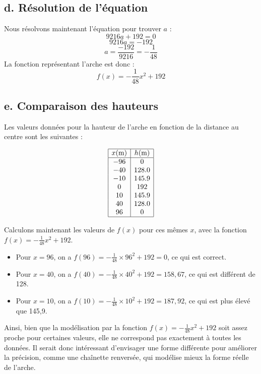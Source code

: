 \documentclass[a4paper, 12pt]{article}
\begin{document}
\subsection*{d. Résolution de l'équation}
Nous résolvons maintenant l’équation pour trouver \(a\) :
\[
9216a + 192 = 0
\]
\[
9216a = -192
\]
\[
a = \frac{-192}{9216} = -\frac{1}{48}
\]
La fonction représentant l’arche est donc :
\[
f(x) = -\frac{1}{48}x^2 + 192
\]

\subsection*{e. Comparaison des hauteurs}

Les valeurs données pour la hauteur de l’arche en fonction de la distance au centre sont les suivantes :

\[
\begin{array}{|c|c|}
\hline
x (\text{m}) & h (\text{m}) \\
\hline
-96 & 0 \\
-40 & 128.0 \\
-10 & 145.9 \\
0 & 192 \\
10 & 145.9 \\
40 & 128.0 \\
96 & 0 \\
\hline
\end{array}
\]

Calculons maintenant les valeurs de \( f(x) \) pour ces mêmes \( x \), avec la fonction \( f(x) = -\frac{1}{48}x^2 + 192 \).

\begin{itemize}[noitemsep]
    \item Pour \( x = 96 \), on a \( f(96) = -\frac{1}{48} \times 96^2 + 192 = 0 \), ce qui est correct.
    \item Pour \( x = 40 \), on a \( f(40) = -\frac{1}{48} \times 40^2 + 192 = 158{,}67 \), ce qui est différent de 128.
    \item Pour \( x = 10 \), on a \( f(10) = -\frac{1}{48} \times 10^2 + 192 = 187{,}92 \), ce qui est plus élevé que 145{,}9.
\end{itemize}

Ainsi, bien que la modélisation par la fonction \( f(x) = -\frac{1}{48}x^2 + 192 \) soit assez proche pour certaines valeurs, elle ne correspond pas exactement à toutes les données. Il serait donc intéressant d’envisager une forme différente pour améliorer la précision, comme une chaînette renversée, qui modélise mieux la forme réelle de l’arche.
\end{document}
